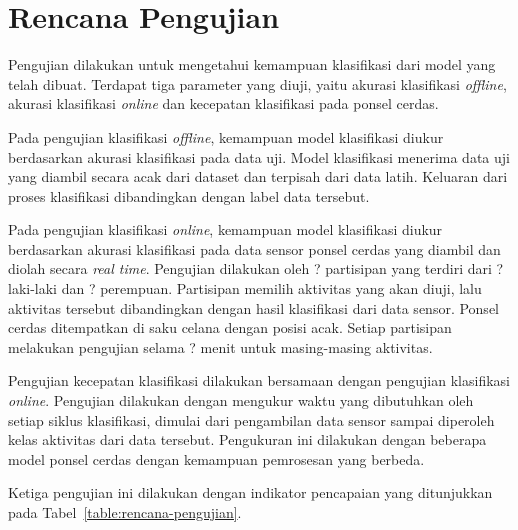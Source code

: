 %
\section{Rencana Pengujian}
Pengujian dilakukan untuk mengetahui kemampuan klasifikasi dari model yang telah dibuat. Terdapat tiga parameter yang diuji, yaitu akurasi klasifikasi \textit{offline}, akurasi klasifikasi \textit{online} dan kecepatan klasifikasi pada ponsel cerdas.

Pada pengujian klasifikasi \textit{offline}, kemampuan model klasifikasi diukur berdasarkan akurasi klasifikasi pada data uji. Model klasifikasi menerima data uji yang diambil secara acak dari dataset dan terpisah dari data latih. Keluaran dari proses klasifikasi dibandingkan dengan label data tersebut.

Pada pengujian klasifikasi \textit{online}, kemampuan model klasifikasi diukur berdasarkan akurasi klasifikasi pada data sensor ponsel cerdas yang diambil dan diolah secara \textit{real time}. Pengujian dilakukan oleh ? partisipan yang terdiri dari ? laki-laki dan ? perempuan. Partisipan memilih aktivitas yang akan diuji, lalu aktivitas tersebut dibandingkan dengan hasil klasifikasi dari data sensor. Ponsel cerdas ditempatkan di saku celana dengan posisi acak. Setiap partisipan melakukan pengujian selama ? menit untuk masing-masing aktivitas.

Pengujian kecepatan klasifikasi dilakukan bersamaan dengan pengujian klasifikasi \textit{online}. Pengujian dilakukan dengan mengukur waktu yang dibutuhkan oleh setiap siklus klasifikasi, dimulai dari pengambilan data sensor sampai diperoleh kelas aktivitas dari data tersebut. Pengukuran ini dilakukan dengan beberapa model ponsel cerdas dengan kemampuan pemrosesan yang berbeda.

Ketiga pengujian ini dilakukan dengan indikator pencapaian yang ditunjukkan pada Tabel~\ref{table:rencana-pengujian}.

